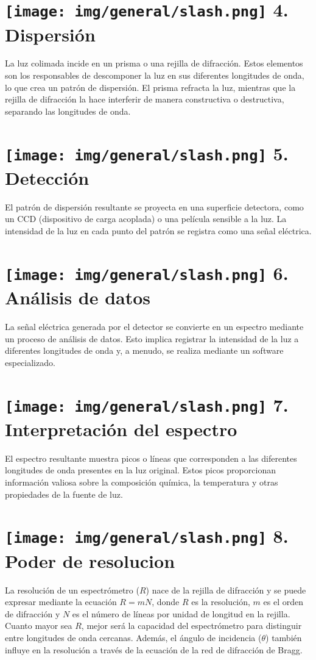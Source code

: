 \documentclass[a0paper,fleqn]{src/betterposter}
\begin{document}
{\section{\texttt{[image: img/general/slash.png]} 4. Dispersión}
La luz colimada incide en un prisma o una rejilla de difracción. Estos elementos
son los responsables de descomponer la luz en sus diferentes longitudes de onda,
lo que crea un patrón de dispersión. El prisma refracta la luz, mientras que la
rejilla de difracción la hace interferir de manera constructiva o destructiva,
separando las longitudes de onda.

}{ %

\section{\texttt{[image: img/general/slash.png]} 5. Detección}
El patrón de dispersión resultante se proyecta en una superficie detectora, como
un CCD (dispositivo de carga acoplada) o una película sensible a la luz. La
intensidad de la luz en cada punto del patrón se registra como una señal
eléctrica.

\section{\texttt{[image: img/general/slash.png]} 6. Análisis de datos}
La señal eléctrica generada por el detector se convierte en un espectro mediante
un proceso de análisis de datos. Esto implica registrar la intensidad de la luz
a diferentes longitudes de onda y, a menudo, se realiza mediante un software
especializado.

\section{\texttt{[image: img/general/slash.png]} 7. Interpretación del espectro}
El espectro resultante muestra picos o líneas que corresponden a las diferentes
longitudes de onda presentes en la luz original. Estos picos proporcionan
información valiosa sobre la composición química, la temperatura y otras
propiedades de la fuente de luz. 

\section{\texttt{[image: img/general/slash.png]} 8. Poder de resolucion}
La resolución de un espectrómetro ($R$) nace de la rejilla de difracción y se
puede expresar mediante la ecuación $R = mN$, donde $R$ es la resolución, $m$ es
el orden de difracción y $N$ es el número de líneas por unidad de longitud en la
rejilla. Cuanto mayor sea $R$, mejor será la capacidad del espectrómetro para distinguir entre longitudes de onda cercanas. Además, el ángulo de incidencia ($\theta$) también influye en la resolución a través de la ecuación de la red de difracción de Bragg. 

}
\end{document}
